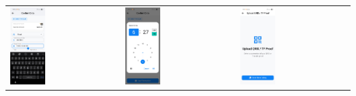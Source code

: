 \begin{tabular}{lll}
    \includegraphics[width=0.33\textwidth]{images/UI/qris-tn.jpg} &
    \includegraphics[width=0.33\textwidth]{images/UI/qris-tt.jpg} &
    \includegraphics[width=0.33\textwidth]{images/UI/qris-upload.jpg}

\end{tabular}
